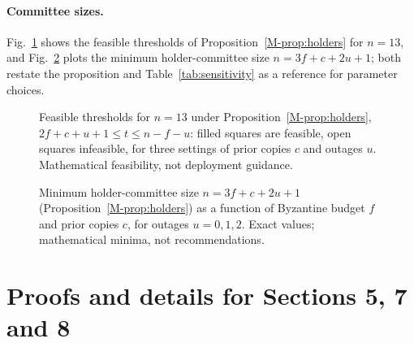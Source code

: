 \documentclass[pdflatex,sn-mathphys-num]{sn-jnl}
\theoremstyle{plain}
\begin{document}
\paragraph{Committee sizes.}
Fig.~\ref{fig:feasible} shows the feasible thresholds of Proposition~\ref{M-prop:holders} for $n=13$, and Fig.~\ref{fig:minholders} plots the minimum holder-committee size $n=3f+c+2u+1$; both restate the proposition and Table~\ref{tab:sensitivity} as a reference for parameter choices.

\begin{figure}[htbp]
\centering
\figbox{}
\caption{Feasible thresholds for $n=13$ under Proposition~\ref{M-prop:holders}, $2f+c+u+1\le t\le n-f-u$: filled squares are feasible, open squares infeasible, for three settings of prior copies $c$ and outages $u$. Mathematical feasibility, not deployment guidance.}\label{fig:feasible}
\end{figure}

\begin{figure}[htbp]
\centering
\figbox{}
\caption{Minimum holder-committee size $n=3f+c+2u+1$ (Proposition~\ref{M-prop:holders}) as a function of Byzantine budget $f$ and prior copies $c$, for outages $u=0,1,2$. Exact values; mathematical minima, not recommendations.}\label{fig:minholders}
\end{figure}


\section{Proofs and details for Sections 5, 7 and 8}\label{sec:s-proofs}
\end{document}
